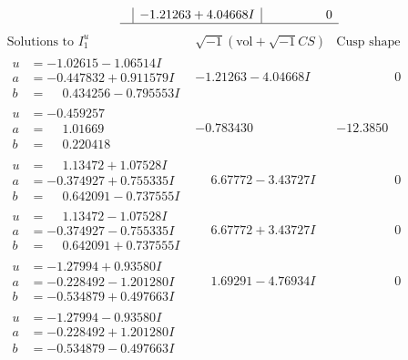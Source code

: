 \documentclass[1p]{elsarticle_modified}
\theoremstyle{definition}
\newcommand{\I}{\sqrt{-1}}
\begin{document}
$$\begin{array}{c|c|c}
 & -1.21263 + 4.04668 I & \phantom{-0.000000 } 0\\
 \hline 
 \end{array}$$\newpage$$\begin{array}{c|c|c}  
\text{Solutions to }I^u_{1}& \I (\text{vol} + \sqrt{-1}CS) & \text{Cusp shape}\\
 \hline 
\begin{aligned}
u &= -1.02615 - 1.06514 I \\
a &= -0.447832 + 0.911579 I \\
b &= \phantom{-}0.434256 - 0.795553 I\end{aligned}
 & -1.21263 - 4.04668 I & \phantom{-0.000000 } 0 \\ \hline\begin{aligned}
u &= -0.459257\phantom{ +0.000000I} \\
a &= \phantom{-}1.01669\phantom{ +0.000000I} \\
b &= \phantom{-}0.220418\phantom{ +0.000000I}\end{aligned}
 & -0.783430\phantom{ +0.000000I} & -12.3850\phantom{ +0.000000I} \\ \hline\begin{aligned}
u &= \phantom{-}1.13472 + 1.07528 I \\
a &= -0.374927 + 0.755335 I \\
b &= \phantom{-}0.642091 - 0.737555 I\end{aligned}
 & \phantom{-}6.67772 - 3.43727 I & \phantom{-0.000000 } 0 \\ \hline\begin{aligned}
u &= \phantom{-}1.13472 - 1.07528 I \\
a &= -0.374927 - 0.755335 I \\
b &= \phantom{-}0.642091 + 0.737555 I\end{aligned}
 & \phantom{-}6.67772 + 3.43727 I & \phantom{-0.000000 } 0 \\ \hline\begin{aligned}
u &= -1.27994 + 0.93580 I \\
a &= -0.228492 - 1.201280 I \\
b &= -0.534879 + 0.497663 I\end{aligned}
 & \phantom{-}1.69291 - 4.76934 I & \phantom{-0.000000 } 0 \\ \hline\begin{aligned}
u &= -1.27994 - 0.93580 I \\
a &= -0.228492 + 1.201280 I \\
b &= -0.534879 - 0.497663 I\end{aligned}

\end{array}$$
\end{document}

